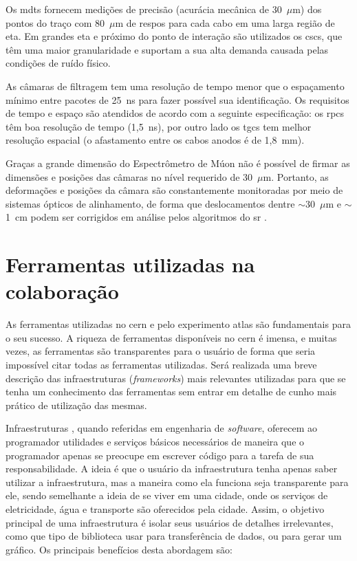 Os \glspl{mdt} fornecem medições de precisão (acurácia mecânica de 30~$\mu$m) 
dos pontos do traço com 80~$\mu$m de \gls{respos}
para cada cabo em uma larga região de \gls{eta}. Em grandes \gls{eta} e próximo
do ponto de interação são utilizados os \glspl{csc}, que têm uma maior
granularidade e suportam a sua alta demanda causada pelas condições de ruído
físico.
 
As câmaras de filtragem tem uma resolução de tempo menor que o espaçamento
mínimo entre pacotes de 25~ns para fazer possível sua identificação. Os
requisitos de tempo e espaço são atendidos de acordo com a seguinte
especificação: os \glspl{rpc} têm boa resolução de tempo (1,5~ns), por outro
lado os \glspl{tgc} tem melhor resolução espacial 
(o afastamento entre os cabos anodos é de 1,8~mm).

Graças a grande dimensão do Espectrômetro de Múon não é possível de firmar as
dimensões e posições das câmaras no nível requerido de 30~$\mu$m. Portanto, as
deformações e posições da câmara são constantemente monitoradas por meio de
sistemas ópticos de alinhamento, de forma que deslocamentos dentre $\sim$30~$\mu$m e $\sim$1~cm 
podem ser corrigidos em análise pelos algoritmos do
\glsdesc{sr} \cite{muon_tdr}.

\section{Ferramentas utilizadas na colaboração}
\label{sec:ferramentas}

As ferramentas utilizadas no \gls{cern} e pelo experimento \gls{atlas} são
fundamentais para o seu sucesso. A riqueza de ferramentas disponíveis
no \gls{cern} é imensa, e muitas vezes, as ferramentas são
transparentes para o usuário de forma que seria impossível citar todas as 
ferramentas utilizadas. Será realizada uma breve descrição das infraestruturas (\emph{frameworks}) 
mais relevantes utilizadas para que se tenha um conhecimento das ferramentas 
sem entrar em detalhe de cunho mais prático de utilização das mesmas.

Infraestruturas \cite{root}, quando referidas em engenharia de \emph{software},
oferecem ao programador utilidades e serviços básicos necessários de maneira que
o programador apenas se preocupe em escrever código para a tarefa de sua responsabilidade. 
A ideia é que o usuário da infraestrutura tenha apenas saber
utilizar a infraestrutura, mas a maneira como ela funciona seja transparente
para ele, sendo semelhante a ideia de se viver em uma cidade, onde os serviços
de eletricidade, água e transporte são oferecidos pela cidade. Assim, o objetivo
principal de uma infraestrutura é isolar seus usuários de detalhes irrelevantes,
como que tipo de biblioteca usar para transferência de dados, ou para gerar um
gráfico. Os principais benefícios desta abordagem são:

